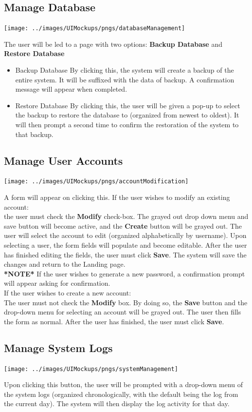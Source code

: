 \documentclass{article}
\begin{document}
\subsection{Manage Database}
\centerline{\texttt{[image: ../images/UIMockups/pngs/databaseManagement]}}
\label{manageDB}
The user will be led to a page with two options: \textbf{Backup Database} and
\textbf{Restore Database}
\begin{itemize}
  \item Backup Database
    By clicking this, the system will create a backup of the entire system.
    It will be suffixed with the data of backup. A confirmation message will
    appear when completed.
  \item Restore Database
    By clicking this, the user will be given a pop-up to select the backup to
    restore the database to (organized from newest to oldest). It will then
    prompt a second time to confirm the restoration of the system to that backup.
\end{itemize}

\subsection{Manage User Accounts}
\centerline{\texttt{[image: ../images/UIMockups/pngs/accountModification]}}
\label{manageAccts}
A form will appear on clicking this. 
If the user wishes to modify an existing account: \\
the user must check the \textbf{Modify} check-box. The grayed out drop down menu and
save button will become active, and the \textbf{Create} button will be grayed out.
The user will select the account to edit (organized alphabetically by username).
Upon selecting a user, the form fields will populate and become editable. After
the user has finished editing the fields, the user must click \textbf{Save}. The system
will save the changes and return to the Landing page. \\
\textbf{*NOTE*} If the user wishes to generate a new password, a confirmation
prompt will appear asking for confirmation.\\
If the user wishes to create a new account: \\
The user must not check the \textbf{Modify} box. By doing so, the \textbf{Save}
button and the drop-down menu for selecting an account will be grayed out.
The user then fills the form as normal. After the user has finished, the user
must click \textbf{Save}.
\subsection{Manage System Logs}
\centerline{\texttt{[image: ../images/UIMockups/pngs/systemManagement]}}
\label{manageLogs}
Upon clicking this button, the user will be prompted with a drop-down menu of
the system logs (organized chronologically, with the default being the log
from the current day). The system will then display the log activity for
that day.
\end{document}
